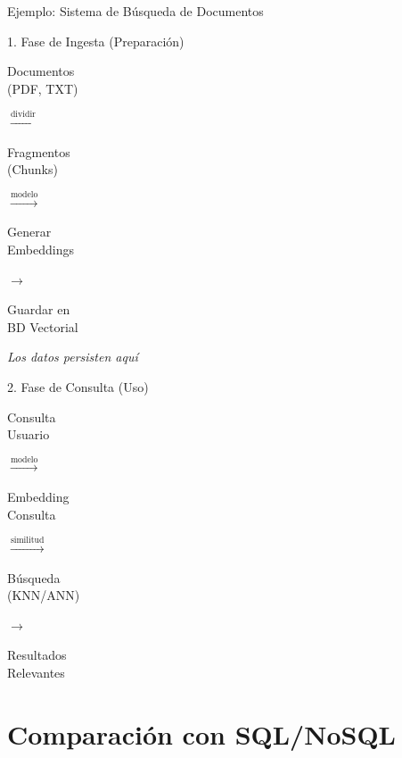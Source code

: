 \documentclass[aspectratio=169]{beamer}
\begin{document}
\begin{frame}{Ejemplo: Sistema de Búsqueda de Documentos}

    \newcommand{\caja}[2]{%
        \colorbox{#1}{\parbox[c][0.8cm][c]{2cm}{\centering \scriptsize #2}}%
    }

    \begin{block}{1. Fase de Ingesta (Preparación)}
        \centering
        \caja{blue!20}{Documentos\\(PDF, TXT)}
        $\xrightarrow{\text{dividir}}$
        \caja{yellow!20}{Fragmentos\\(Chunks)}
        $\xrightarrow{\text{modelo}}$
        \caja{orange!20}{Generar\\Embeddings}
        $\rightarrow$
        \caja{green!20}{Guardar en\\BD Vectorial}
    \end{block}

    \vspace{0.2cm}
    \centering \faArrowDown \hspace{0.2cm} \textit{\scriptsize Los datos persisten aquí}
    \vspace{0.2cm}

    \begin{alertblock}{2. Fase de Consulta (Uso)}
        \centering
        \caja{purple!20}{Consulta\\Usuario}
        $\xrightarrow{\text{modelo}}$
        \caja{orange!20}{Embedding\\Consulta}
        $\xrightarrow{\text{similitud}}$
        \caja{green!20}{Búsqueda\\(KNN/ANN)}
        $\rightarrow$
        \caja{red!20}{Resultados\\Relevantes}
    \end{alertblock}

\end{frame}

\section{Comparación con SQL/NoSQL}
\end{document}
